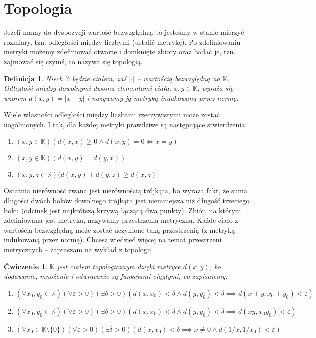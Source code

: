 \documentclass[a4paper,fleqn,9pt]{extarticle}
\newtheorem{prb}[prbh]{\'Cwiczenie}
\newtheorem{dff}{Definicja}
\newenvironment{enumx}{\begin{enumerate}
	\setlength{\itemsep}{0pt}
	\setlength{\parskip}{0pt}
	\setlength{\parsep}{0pt}}
{\end{enumerate}}
\begin{document}
\section{Topologia}
Jeżeli mamy do dyspozycji wartość bezwzględną, to jesteśmy w stanie mierzyć rozmiary, tzn. odległości między liczbymi (ustalić metrykę).
Po zdefiniowaniu metryki możemy zdefiniować otwarte i domknięte zbiory oraz badać je, tzn. zajmować się czymś, co nazywa się topologią.

\begin{dff}
Niech $\mathbb K$ będzie ciałem, zaś $|\cdot|$ -- wartością bezwzględną na $\mathbb K$.
Odległość między dowolnymi dwoma elementami ciała, $x,y\in\mathbb K$, wyraża się wzorem $d(x,y) = |x-y|$ i nazywamy ją metryką indukowaną przez normę.
\end{dff}

Wiele własności odległości między liczbami rzeczywistymi może zostać uogólnionych.
I tak, dla każdej metryki prawdziwe są następujące stwierdzenia:
\begin{enumx}
\item $(x,y \in \mathbb K) (d(x,x) \ge 0 \wedge d(x,y) = 0 \iff x = y)$
\item $(x,y \in \mathbb K) (d(x,y) = d(y,x))$
\item $(x,y,z \in \mathbb K) (d(x,y) + d(y,z) \ge d(x,z)$
\end{enumx}

Ostatnia nierówność zwana jest nierównością trójkąta, bo wyraża fakt, że suma długości dwóch boków dowolnego trójkąta jest niemniejsza niż długość trzeciego boku (odcinek jest najkrótszą krzywą łączącą dwa punkty).
Zbiór, na którym zdefiniowana jest metryka, nazywamy przestrzenią metryczną.
Każde ciało z wartością bezwzględną może zostać uczynione taką przestrzenią (z metryką indukowaną przez normę).
Chcesz wiedzieć więcej na temat przestrzeni metrycznych -- zapraszam na wykład z topologii.

\begin{prb}
$\mathbb K$ jest ciałem topologicznym dzięki metryce $d(x,y)$, bo dodawanie, mnożenie i odwracanie są funkcjami ciągłymi, co zapisujemy:
\begin{enumx}
\item $(\forall x_0, y_0 \in \mathbb K) (\forall \varepsilon > 0) (\exists \delta > 0)(d(x,x_0) < \delta \wedge d(y,y_0) < \delta \implies d(x+y,x_0+y_0) < \varepsilon)$
\item $(\forall x_0, y_0 \in \mathbb K) (\forall \varepsilon > 0) (\exists \delta > 0)(d(x,x_0) < \delta \wedge d(y,y_0) < \delta \implies d(xy,x_0y_0) < \varepsilon)$
\item $(\forall x_0 \in \mathbb K\setminus\{0\}) (\forall \varepsilon > 0) (\exists \delta > 0)(d(x,x_0) < \delta \implies x \neq 0 \wedge d(1/x, 1/x_0) < \varepsilon)$
\end{enumx}
\end{prb}
\end{document}
